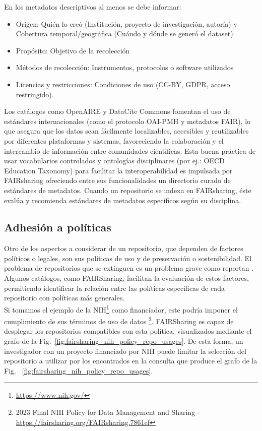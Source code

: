 \documentclass[runningheads]{llncs}
\begin{document}
En los metadatos descriptivos al menos se debe informar:  
\begin{itemize}
\item Origen: Quién lo creó (Institución, proyecto de investigación, autoría) y Cobertura temporal/geográfica (Cuándo y dónde se generó el dataset) 
\item Propósito: Objetivo de la recolección 
\item Métodos de recolección: Instrumentos, protocolos o software utilizados 
\item Licencias y restricciones: Condiciones de uso (CC-BY, GDPR, acceso restringido).
\end{itemize}

Los catálogos como OpenAIRE y DataCite Commons fomentan el uso de estándares internacionales (como el protocolo OAI-PMH y metadatos FAIR), lo que asegura que los datos sean fácilmente localizables, accesibles y reutilizables por diferentes plataformas y sistemas, favoreciendo la colaboración y el intercambio de información entre comunidades científicas. Esta buena práctica de usar vocabularios controlados
y ontologías disciplinares (por ej.:  OECD Education Taxonomy) para facilitar la interoperabilidad es impulsada por FAIRsharing  ofreciendo entre sus funcionalidades un directorio curado de estándares de metadatos. Cuando un repositorio se indexa  en FAIRsharing, éste evalúa y recomienda estándares de metadatos específicos según su disciplina. \\

\subsection*{Adhesión a políticas}
Otro de los aspectos a considerar de un repositorio, que dependen de factores políticos o legales, son sus políticas de uso y de preservación o sostenibilidad. 
El problema de repositorios que se extinguen es un problema grave como reportan \cite{strecker_disappearing_repos_23}.
Algunos catálogos, como FAIRSharing, facilitan la evaluación de estos factores, permitiendo identificar la relación entre las políticas específicas de cada repositorio con políticas más generales.\\
Si tomamos el ejemplo de la NIH\footnote{\url{https://www.nih.gov/}} como financiador, este podría imponer el cumplimiento de sus términos de uso de datos \footnote{\label{nih_policy_fairsharing} 2023 Final NIH Policy for Data Management and Sharing - \url{https://fairsharing.org/FAIRsharing.7861ef}}. FAIRSharing es capaz de desplegar los repositorios compatibles con esta política, visualizados mediante el grafo de la Fig.~\ref{fig:fairsharing_nih_policy_repo_usages}. De esta forma, un investigador con un proyecto financiado por NIH puede limitar la selección del repositorio a utilizar por los encontrados en la consulta que produce el grafo de la Fig. ~\ref{fig:fairsharing_nih_policy_repo_usages}.\\
\end{document}
